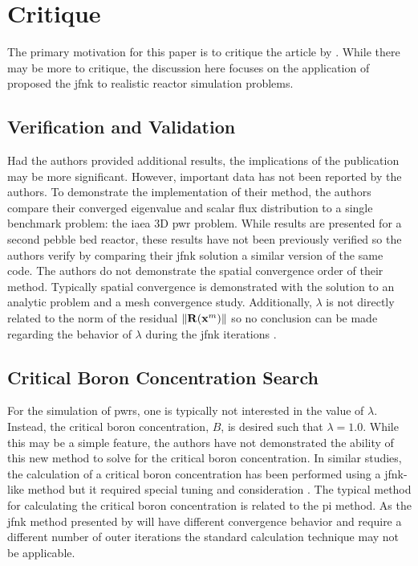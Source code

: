\section{Critique}
\label{sec:critique}
  The primary motivation for this paper is to critique the article by
  \citeauthor{qe2paper}. While there may be more to critique, the discussion
  here focuses on the application of proposed the \gls{jfnk} to realistic
  reactor simulation problems.

  \subsection{Verification and Validation}
    Had the authors provided additional results, the implications of the
    publication may be more significant. However, important data has not been
    reported by the authors. To demonstrate the implementation of their method,
    the authors compare their converged eigenvalue and scalar flux distribution 
    to a single benchmark problem: the \gls{iaea} 3D \gls{pwr} problem. While
    results are presented for a second pebble bed reactor, these results have
    not been previously verified so the authors verify by comparing their
    \gls{jfnk} solution a similar version of the same code. The authors do not
    demonstrate the spatial convergence order of their method. Typically spatial
    convergence is demonstrated with the solution to an analytic problem and a
    mesh convergence study. Additionally, $\lambda$ is not directly related to
    the norm of the residual $\| \mathbf{R} (\mathbf{x}^m) \|$ so no conclusion can be
    made regarding the behavior of $\lambda$ during the \gls{jfnk} iterations
    \cite{caslJFNK}.

  \subsection{Critical Boron Concentration Search}
    For the simulation of \glspl{pwr}, one is typically not interested in the
    value of $\lambda$. Instead, the critical boron concentration, $B$, is
    desired such that $\lambda=1.0$. While this may be a simple feature, the
    authors have not demonstrated the ability of this new method to solve for
    the critical boron concentration. In similar studies, the calculation of a
    critical boron concentration has been performed using a \gls{jfnk}-like
    method but it required special tuning and consideration \cite{caslJFNK}. The
    typical method for calculating the critical boron concentration is related
    to the \gls{pi} method. As the \gls{jfnk} method presented by
    \citeauthor{qe2paper} will have different convergence behavior and require a
    different number of outer iterations the standard calculation technique may
    not be applicable.

